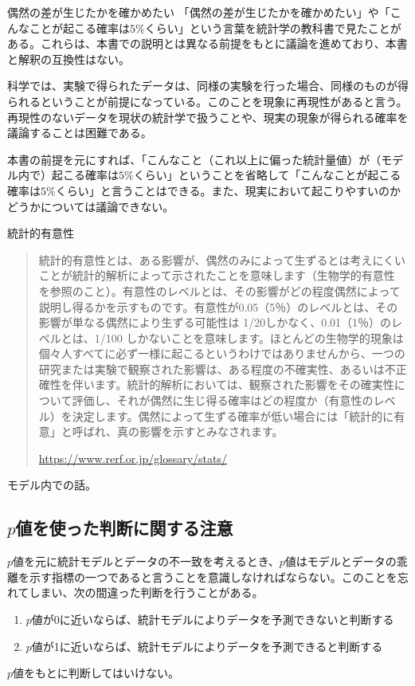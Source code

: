 \begin{SMbox}{偶然の差が生じたかを確かめたい}
    「偶然の差が生じたかを確かめたい」や「こんなことが起こる確率は$5\%$くらい」という言葉を統計学の教科書で見たことがある。これらは、本書での説明とは異なる前提をもとに議論を進めており、本書と解釈の互換性はない。

    科学では、実験で得られたデータは、同様の実験を行った場合、同様のものが得られるということが前提になっている。このことを現象に再現性があると言う。
    再現性のないデータを現状の統計学で扱うことや、現実の現象が得られる確率を議論することは困難である。

    本書の前提を元にすれば、「こんなこと（これ以上に偏った統計量値）が（モデル内で）起こる確率は$5\%$くらい」ということを省略して「こんなことが起こる確率は$5\%$くらい」と言うことはできる。また、現実において起こりやすいのかどうかについては議論できない。
\end{SMbox}


\begin{SMbox}{統計的有意性}
 \begin{quote}
  統計的有意性とは、ある影響が、偶然のみによって生ずるとは考えにくいことが統計的解析によって示されたことを意味します（生物学的有意性 を参照のこと）。有意性のレベルとは、その影響がどの程度偶然によって説明し得るかを示すものです。有意性が0.05（5％）のレベルとは、その影響が単なる偶然により生ずる可能性は 1/20しかなく、0.01（1％）のレベルとは、1/100 しかないことを意味します。ほとんどの生物学的現象は個々人すべてに必ず一様に起こるというわけではありませんから、一つの研究または実験で観察された影響は、ある程度の不確実性、あるいは不正確性を伴います。統計的解析においては、観察された影響をその確実性について評価し、それが偶然に生じ得る確率はどの程度か（有意性のレベル）を決定します。偶然によって生ずる確率が低い場合には「統計的に有意」と呼ばれ、真の影響を示すとみなされます。

  \url{https://www.rerf.or.jp/glossary/stats/}
 \end{quote}

 モデル内での話。
\end{SMbox}


\subsection{$p$値を使った判断に関する注意}
$p$値を元に統計モデルとデータの不一致を考えるとき、$p$値はモデルとデータの乖離を示す指標の一つであると言うことを意識しなければならない。このことを忘れてしまい、次の間違った判断を行うことがある。
\begin{enumerate}
    \item $p$値が0に近いならば、統計モデルによりデータを予測できないと判断する
    \item $p$値が1に近いならば、統計モデルによりデータを予測できると判断する
\end{enumerate}
$p$値をもとに判断してはいけない。

